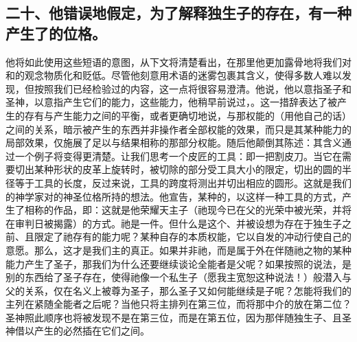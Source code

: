 
\subsection{二十、他错误地假定，为了解释独生子的存在，有一种产生了的位格。}

他将如此使用这些短语的意图，从下文将清楚看出，在那里他更加露骨地将我们对和的观念物质化和贬低。尽管他刻意用术语的迷雾包裹其含义，使得多数人难以发现，但按照我们已经检验过的内容，这一点将很容易澄清。他说，他以意指圣子和圣神，以意指产生它们的能力，这些能力，他稍早前说过，。这一措辞表达了被产生的存有与产生能力之间的平衡，或者更确切地说，与那权能的（用他自己的话）之间的关系，暗示被产生的东西并非操作者全部权能的效果，而只是其某种能力的局部效果，仅施展了足以与结果相称的那部分权能。随后他颠倒其陈述：其含义通过一个例子将变得更清楚。让我们思考一个皮匠的工具：即一把割皮刀。当它在需要切出某种形状的皮革上旋转时，被切除的部分受工具大小的限定，切出的圆的半径等于工具的长度，反过来说，工具的跨度将测出并切出相应的圆形。这就是我们的神学家对的神圣位格所持的想法。他宣告，某种的，以这样一种工具的方式，产生了相称的作品，即：这就是他荣耀天主子（祂现今已在父的光荣中被光荣，并将在审判日被揭露）的方式。祂是一件。但什么是这个、并被设想为存在于独生子之前、且限定了祂存有的能力呢？某种自存的本质权能，它以自发的冲动行使自己的意愿。那么，这才是我们主的真正。如果并非祂，而是属于外在伴随祂之物的某种能力产生了圣子，那我们为什么还要继续谈论全能者是父呢？如果按照的说法，是别的东西给了圣子存在，使得祂像一个私生子（愿我主宽恕这种说法！）般潜入与父的关系，仅在名义上被尊为圣子，那么圣子又如何能继续是子呢？怎能将我们的主列在紧随全能者之后呢？当他只将主排列在第三位，而将那中介的放在第二位？圣神照此顺序也将被发现不是在第三位，而是在第五位，因为那伴随独生子、且圣神借以产生的必然插在它们之间。\par

